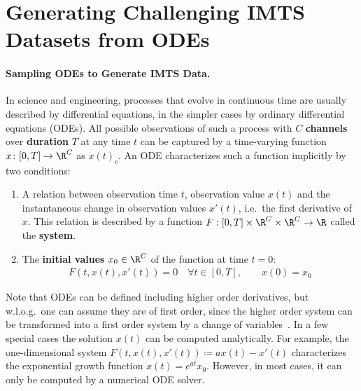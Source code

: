 \section{Generating Challenging IMTS Datasets from ODEs}

\paragraph{Sampling ODEs to Generate IMTS Data.}\label{sec:sampling}

In science and engineering, processes that evolve in continuous time are usually described by
differential equations, in the simpler cases by ordinary differential equations (ODEs).
All possible observations of such a process with $C$ \textbf{channels}
over \textbf{duration} $T$ at any time $t$ can be captured by a time-varying function
${x\colon [0,T]\to\R^C}$ as $x(t)_c$.
An ODE characterizes such a function implicitly by two conditions:
%
\begin{enumerate}
\item A relation between observation time $t$, observation value $x(t)$ and
the instantaneous change in observation values $x'(t)$, i.e.\ the first derivative of $x$.
This relation is described by a function $F: [0, T]\times\R^C\times\R^C\to\R$
called the \textbf{system}.

\item The \textbf{initial values} $x_0\in\R^C$ of the function at time $t=0$:
%
\begin{align}\label{eq:initial_value_problem}
	F(t, x(t), x'(t)) = 0 \quad \forall t\in[0,T], \qquad  x(0) = x_0
\end{align}
\end{enumerate}

%
Note that ODEs can be defined including higher order derivatives, but w.l.o.g.\ one can assume they are of first order, since the higher order system can be transformed into a first order system by a change of variables~\citep{Teschl2012.Ordinary}.
In a few special cases the solution $x(t)$ can be computed analytically. For example, the one-dimensional system $F(t, x(t), x'(t))\coloneqq a x(t) - x'(t)$ characterizes
the exponential growth function $x(t) = e^{at}x_0$. However, in most cases, it
can only be computed by a numerical ODE solver.


